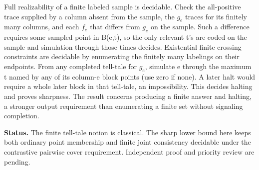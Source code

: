 \documentclass[11pt]{article}
\begin{document}
Full realizability of a finite labeled sample is decidable. Check the all-positive trace supplied by a column absent from the sample, the \(g_{e}\) traces for its finitely many columns, and each \(f_{e}\) that differs from \(g_{e}\) on the sample. Such a difference requires some sampled point in B(e,t), so the only relevant t's are coded on the sample and simulation through those times decides. Existential finite crossing constraints are decidable by enumerating the finitely many labelings on their endpoints. From any completed tell-tale for \(g_{e}\), simulate e through the maximum t named by any of its column-e block points (use zero if none). A later halt would require a whole later block in that tell-tale, an impossibility. This decides halting and proves sharpness. The result concerns producing a finite answer and halting, a stronger output requirement than enumerating a finite set without signaling completion.

\textbf{Status.} The finite tell-tale notion is classical. The sharp lower bound here keeps both ordinary point membership and finite joint consistency decidable under the contrastive pairwise cover requirement. Independent proof and priority review are pending.
\end{document}
